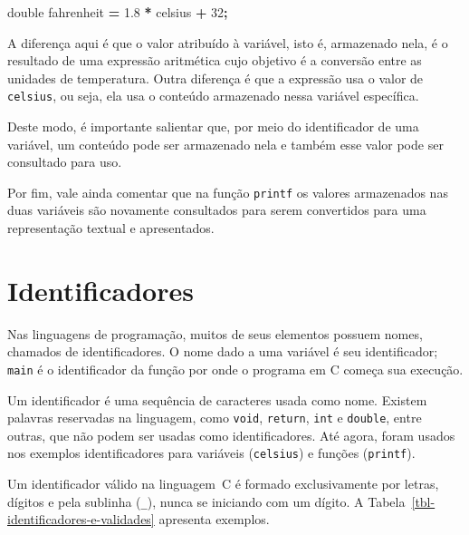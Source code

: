 \documentclass[
  11pt,
  a4paper,
]{scrbook}
\newenvironment{Shaded}{\begin{snugshade}}{\end{snugshade}}
\newcommand{\DataTypeTok}[1]{\textcolor[rgb]{0.13,0.29,0.53}{#1}}
\newcommand{\DecValTok}[1]{\textcolor[rgb]{0.00,0.00,0.81}{#1}}
\newcommand{\FloatTok}[1]{\textcolor[rgb]{0.00,0.00,0.81}{#1}}
\newcommand{\NormalTok}[1]{#1}
\newcommand{\OperatorTok}[1]{\textcolor[rgb]{0.81,0.36,0.00}{\textbf{#1}}}
\begin{document}
\begin{Shaded}
\begin{Highlighting}[]
\DataTypeTok{double}\NormalTok{ fahrenheit }\OperatorTok{=} \FloatTok{1.8} \OperatorTok{*}\NormalTok{ celsius }\OperatorTok{+} \DecValTok{32}\OperatorTok{;}
\end{Highlighting}
\end{Shaded}

A diferença aqui é que o valor atribuído à variável, isto é, armazenado
nela, é o resultado de uma expressão aritmética cujo objetivo é a
conversão entre as unidades de temperatura. Outra diferença é que a
expressão usa o valor de \texttt{celsius}, ou seja, ela usa o conteúdo
armazenado nessa variável específica.

Deste modo, é importante salientar que, por meio do identificador de uma
variável, um conteúdo pode ser armazenado nela e também esse valor pode
ser consultado para uso.

Por fim, vale ainda comentar que na função \texttt{printf} os valores
armazenados nas duas variáveis são novamente consultados para serem
convertidos para uma representação textual e apresentados.

\section{Identificadores}\label{identificadores}

Nas linguagens de programação, muitos de seus elementos possuem nomes,
chamados de identificadores. O nome dado a uma variável é seu
identificador; \texttt{main} é o identificador da função por onde o
programa em C começa sua execução.

 Um identificador é uma sequência de caracteres
usada como nome. Existem palavras reservadas na linguagem, como
\texttt{void}, \texttt{return}, \texttt{int} e \texttt{double}, entre
outras, que não podem ser usadas como identificadores. Até agora, foram
usados nos exemplos identificadores para variáveis (\texttt{celsius}) e
funções (\texttt{printf}).

Um identificador válido na linguagem~C é formado exclusivamente por
letras, dígitos e pela sublinha (\texttt{\_}), nunca se iniciando com um
dígito. A Tabela~\ref{tbl-identificadores-e-validades} apresenta
exemplos.
\end{document}
